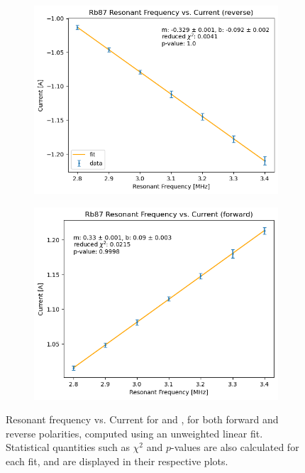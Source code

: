 \documentclass[10pt]{article}
\begin{document}
\begin{figure}
\begin{subfigure}{0.4\textwidth}
			\includegraphics[scale=0.4]{images/rb87-neg.png}
			\caption{}
		\end{subfigure}
		\begin{subfigure}{0.4\textwidth}
			\includegraphics[scale=0.4]{images/rb87-pos.png}
			\caption{}
		\end{subfigure}
		\caption{Resonant frequency vs. Current for  and ,
			for both forward and reverse polarities, computed using an unweighted
			linear fit. Statistical quantities such as \(
			\chi^2 \) and \( p \)-values are also calculated for each fit, and are
		displayed in their respective plots.}  
		\label{res-current}
	\end{figure}
\end{document}
